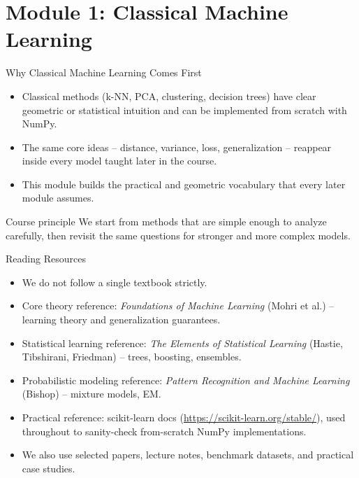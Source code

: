 \section{Module 1: Classical Machine Learning}

\begin{frame}{Why Classical Machine Learning Comes First}
\begin{itemize}
  \item Classical methods (k-NN, PCA, clustering, decision trees) have clear geometric or statistical intuition and can be implemented from scratch with NumPy.
  \pause
  \item The same core ideas -- distance, variance, loss, generalization -- reappear inside every model taught later in the course.
  \pause
  \item This module builds the practical and geometric vocabulary that every later module assumes.
\end{itemize}
\pause
\begin{block}{Course principle}
We start from methods that are simple enough to analyze carefully, then revisit the same questions for stronger and more complex models.
\end{block}
\end{frame}

\begin{frame}{Reading Resources}
\begin{itemize}
  \item We do not follow a single textbook strictly.
  \pause
  \item Core theory reference: \textit{Foundations of Machine Learning} (Mohri et al.) -- learning theory and generalization guarantees.
  \pause
  \item Statistical learning reference: \textit{The Elements of Statistical Learning} (Hastie, Tibshirani, Friedman) -- trees, boosting, ensembles.
  \pause
  \item Probabilistic modeling reference: \textit{Pattern Recognition and Machine Learning} (Bishop) -- mixture models, EM.
  \pause
  \item Practical reference: scikit-learn docs (\url{https://scikit-learn.org/stable/}), used throughout to sanity-check from-scratch NumPy implementations.
  \pause
  \item We also use selected papers, lecture notes, benchmark datasets, and practical case studies.
\end{itemize}
\end{frame}
